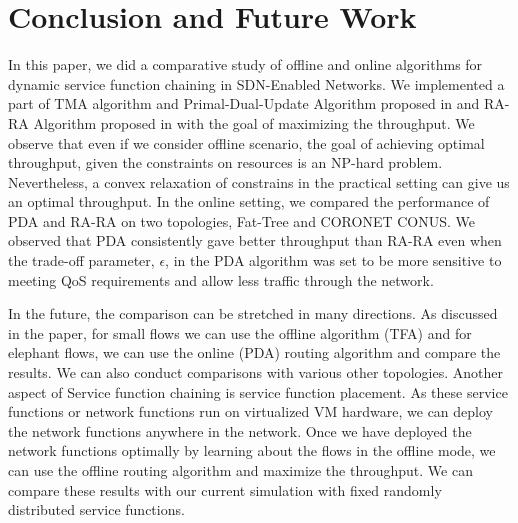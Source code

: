 \section{Conclusion and Future Work}
\label{sec:conclusion}

In this paper, we did a comparative study of offline and online algorithms for dynamic service function chaining in SDN-Enabled Networks. We implemented a part of TMA algorithm and Primal-Dual-Update Algorithm proposed in \cite{ref:paper1} and RA-RA Algorithm proposed in \cite{ref:paper2} with the goal of maximizing the throughput. We observe that even if we consider offline scenario, the goal of achieving optimal throughput, given the constraints on resources is an NP-hard problem. Nevertheless, a convex relaxation of constrains in the practical setting can give us an optimal throughput. In the online setting, we compared the performance of PDA and RA-RA on two topologies, Fat-Tree and CORONET CONUS. We observed that PDA consistently gave better throughput than RA-RA even when the trade-off parameter, $\epsilon$, in the PDA algorithm was set to be more sensitive to meeting QoS requirements and allow less traffic through the network.

In the future, the comparison can be stretched in many directions. As discussed in the paper, for small flows we can use the offline algorithm (TFA) and for elephant flows, we can use the online (PDA) routing algorithm and compare the results. We can also conduct comparisons with various other topologies. 
Another aspect of Service function chaining is service function placement. As these service functions or network functions run on virtualized VM hardware, we can deploy the network functions anywhere in the network. Once we have deployed the network functions optimally by learning about the flows in the offline mode, we can use the offline routing algorithm and maximize the throughput. We can compare these results with our current simulation with fixed randomly distributed service functions.

